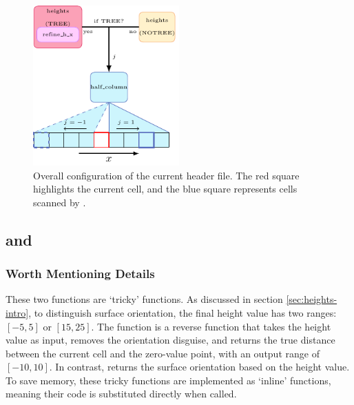 \begin{figure}
    \centering
    \includegraphics[width=0.5\textwidth]{./image/heights-h/heights}
    \caption{Overall configuration of the current header file. The red square highlights the current cell, and the blue square represents cells scanned by .}
    \label{fig:heights-funcconfig}
\end{figure}

\subsection{ and }
\subsubsection{Worth Mentioning Details}
These two functions are `tricky' functions. As discussed in section \ref{sec:heights-intro}, to distinguish surface orientation, the final height value has two ranges: $[-5,5]$ or $[15,25]$. The  function is a reverse function that takes the height value as input, removes the orientation disguise, and returns the true distance between the current cell and the zero-value point, with an output range of $[-10,10]$. In contrast,  returns the surface orientation based on the height value. To save memory, these tricky functions are implemented as `inline' functions, meaning their code is substituted directly when called.

